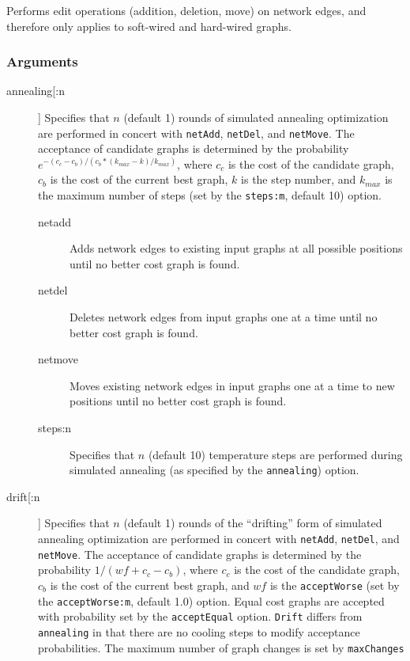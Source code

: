 	\begin{phygdescription}
		{Performs edit operations (addition, deletion, move) on network edges, and therefore
		only applies to soft-wired and hard-wired graphs.}
	\end{phygdescription}

	\subsubsection{Arguments}
		
		\begin{description}
		\item[annealing[:n]] Specifies that $n$ (default 1) rounds of simulated annealing optimization 
		\citep{Metropolisetal1953, Kirkpatricketal1983, Cerny1985} are performed in concert with 
		\texttt{netAdd}, \texttt{netDel}, and \texttt{netMove}. The acceptance of candidate graphs is 
		determined by the probability $e ^ {- (c_c - c_b)/ (c_b * (k_{max} -k)/ k_{max})}$, where $c_c$ 
		is the cost of the candidate graph, $c_b$ is the cost of the current best graph, $k$ is the step 
		number, and $k_{max}$ is the maximum number of steps (set by the \texttt{steps:m}, default 10) 
		option.
		
			\begin{description}
		
			\item[netadd] Adds network edges to existing input graphs at all possible positions until no 
			better cost graph is found.
			
			\item[netdel] Deletes network edges from input graphs one at a time until no better cost 
			graph is found.
			
			\item[netmove] Moves existing network edges in input graphs one at a time to new positions 
			until no better cost graph 
			is found.
			
			\item[steps:n] Specifies that $n$ (default 10) temperature steps are performed during 
			simulated 
			annealing (as specified by the \texttt{annealing}) option.

			\end{description}

			
		\item[drift[:n]] Specifies that $n$ (default 1) rounds of the ``drifting'' form of simulated annealing 
		\citep{goloboff1999} optimization are performed in concert with \texttt{netAdd}, 	\texttt{netDel}, 
		and \texttt{netMove}. The acceptance of candidate graphs is determined by the probability 
		$1/ (wf + c_c - c_b)$, where $c_c$ is the cost of the candidate graph, $c_b$ is the cost of the 
		current best graph, and $wf$ is the \texttt{acceptWorse} (set by the \texttt{acceptWorse:m}, 
		default 1.0) option. Equal cost graphs are accepted with probability set by the \texttt{acceptEqual} 
		option. \texttt{Drift} differs from \texttt{annealing} in that there are no cooling steps to modify 
		acceptance probabilities. The maximum number of graph changes is set by \texttt{maxChanges}
			

\end{description}
